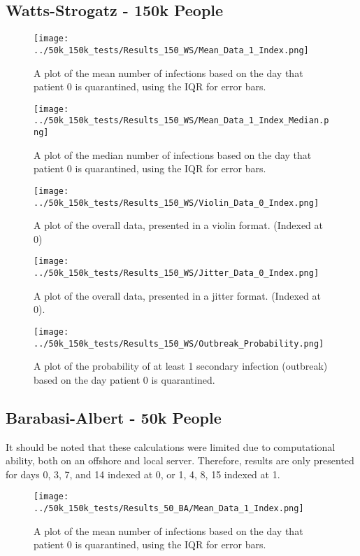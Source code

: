 \documentclass{article}
\numberwithin{equation}{section} %
\begin{document}
\subsection{Watts-Strogatz - 150k People}
\begin{figure}[H]
  \centering
  \texttt{[image: ../50k\_150k\_tests/Results\_150\_WS/Mean\_Data\_1\_Index.png]}
  \caption{A plot of the mean number of infections based on the day that patient 0 is quarantined, using the IQR for error bars.}
\end{figure}

\begin{figure}[H]
  \centering
  \texttt{[image: ../50k\_150k\_tests/Results\_150\_WS/Mean\_Data\_1\_Index\_Median.png]}
  \caption{A plot of the median number of infections based on the day that patient 0 is quarantined, using the IQR for error bars.}
\end{figure}

\begin{figure}[H]
  \centering
  \texttt{[image: ../50k\_150k\_tests/Results\_150\_WS/Violin\_Data\_0\_Index.png]}
  \caption{A plot of the overall data, presented in a violin format. (Indexed at 0)}
\end{figure}

\begin{figure}[H]
  \centering
  \texttt{[image: ../50k\_150k\_tests/Results\_150\_WS/Jitter\_Data\_0\_Index.png]}
  \caption{A plot of the overall data, presented in a jitter format. (Indexed at 0).}
\end{figure}

\begin{figure}[H]
  \centering
  \texttt{[image: ../50k\_150k\_tests/Results\_150\_WS/Outbreak\_Probability.png]}
  \caption{A plot of the probability of at least 1 secondary infection (outbreak) based on the day patient 0 is quarantined.}
\end{figure}

\subsection{Barabasi-Albert - 50k People}
It should be noted that these calculations were limited due to computational ability, both on an offshore and local server. Therefore, results are only presented for days 0, 3, 7, and 14 indexed at 0, or 1, 4, 8, 15 indexed at 1.
\begin{figure}[H]
  \centering
  \texttt{[image: ../50k\_150k\_tests/Results\_50\_BA/Mean\_Data\_1\_Index.png]}
  \caption{A plot of the mean number of infections based on the day that patient 0 is quarantined, using the IQR for error bars.}
\end{figure}
\end{document}
